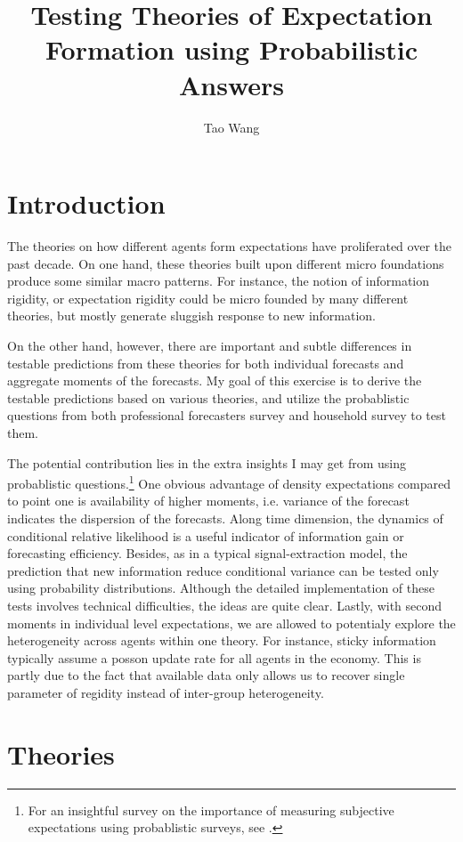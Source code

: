 \documentclass[]{article}
\title{Testing Theories of Expectation Formation using Probabilistic Answers}
\author{Tao Wang}
\begin{document}
\maketitle

\section{Introduction}


The theories on how different agents form expectations have proliferated over the past decade. On one hand, these theories built upon different micro foundations produce some similar macro patterns. For instance, the notion of information rigidity, or expectation rigidity could be micro founded by many different theories, but mostly generate sluggish response to new information.  

On the other hand, however, there are important and subtle differences in testable predictions from these theories for both individual forecasts and aggregate moments of the forecasts. My goal of this exercise is to derive the testable predictions based on various theories, and utilize the probablistic questions from both professional forecasters survey and household survey to test them. 

The potential contribution lies in the extra insights I may get from using probablistic questions.\footnote{For an insightful survey on the importance of measuring subjective expectations using probablistic surveys, see \cite{manski2004measuring}.} One obvious advantage of density expectations compared to point one is availability of higher moments, i.e. variance of the forecast indicates the dispersion of the forecasts. Along time dimension, the dynamics of conditional relative likelihood is a useful indicator of information gain or forecasting efficiency. Besides, as in a typical signal-extraction model, the prediction that new information reduce conditional variance can be tested only using probability distributions. Although the detailed implementation of these tests involves technical difficulties, the ideas are quite clear.  Lastly, with second moments in individual level expectations, we are allowed to potentialy explore the heterogeneity across agents within one theory. For instance, sticky information typically assume a posson update rate for all agents in the economy. This is partly due to the fact that available data only allows us to recover single parameter of regidity instead of inter-group heterogeneity.  

\section{Theories}
\end{document}

